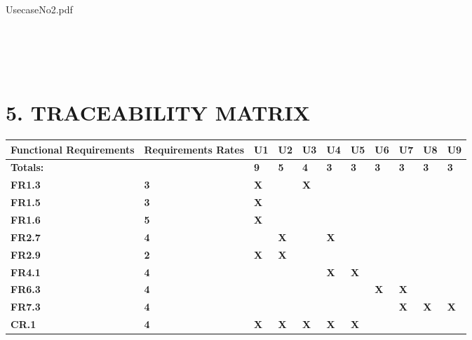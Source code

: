 \documentclass[9pt]{report}
\begin{document}
{UsecaseNo2.pdf}


\section*{\\\\5. TRACEABILITY MATRIX}

\begin{tabular}{|p{2cm}|p{2cm}|p{1cm}|p{1cm}|p{1cm}|p{1cm}|p{1cm}|p{1cm}|p{1cm}|p{1cm}|p{1cm}|}
     \hline
 \rowcolor{lightgray} \textbf{Functional Requirements} & \textbf{Requirements Rates} & \textbf{U1} & \textbf{U2} & \textbf{U3} & \textbf{U4} & \textbf{U5} & \textbf{U6} & \textbf{U7} & \textbf{U8} & \textbf{U9}\\
 \hline
 \textbf{Totals:} & \textbf{} & \textbf{9} & \textbf{5} & \textbf{4} & \textbf{3} & \textbf{3} & \textbf{3} & \textbf{3} & \textbf{3} & \textbf{3}\\
 \hline
 \textbf{FR1.3} & \textbf{3} & \textbf{X} & \textbf{} & \textbf{X} & \textbf{} & \textbf{} & \textbf{} & \textbf{} & \textbf{} & \textbf{}\\
 \hline
 \textbf{FR1.5} & \textbf{3} & \textbf{X} & \textbf{} & \textbf{} & \textbf{} & \textbf{} & \textbf{} & \textbf{} & \textbf{} & \textbf{}\\
 \hline
 \textbf{FR1.6} & \textbf{5} & \textbf{X} & \textbf{} & \textbf{} & \textbf{} & \textbf{} & \textbf{} & \textbf{} & \textbf{} & \textbf{}\\
 \hline
 \textbf{FR2.7} & \textbf{4} & \textbf{} & \textbf{X} & \textbf{} & \textbf{X} & \textbf{} & \textbf{} & \textbf{} & \textbf{} & \textbf{}\\
 \hline
 \textbf{FR2.9} & \textbf{2} & \textbf{X} & \textbf{X} & \textbf{} & \textbf{} & \textbf{} & \textbf{} & \textbf{} & \textbf{} & \textbf{}\\
 \hline
 \textbf{FR4.1} & \textbf{4} & \textbf{} & \textbf{} & \textbf{} & \textbf{X} & \textbf{X} & \textbf{} & \textbf{} & \textbf{} & \textbf{}\\
 \hline
 \textbf{FR6.3} & \textbf{4} & \textbf{} & \textbf{} & \textbf{} & \textbf{} & \textbf{} & \textbf{X} & \textbf{X} & \textbf{} & \textbf{}\\
 \hline
 \textbf{FR7.3} & \textbf{4} & \textbf{} & \textbf{} & \textbf{} & \textbf{} & \textbf{} & \textbf{} & \textbf{X} & \textbf{X} & \textbf{X}\\
 \hline
 \hline
 \textbf{CR.1} & \textbf{4} & \textbf{X} & \textbf{X} & \textbf{X} & \textbf{X} & \textbf{X} & \textbf{} & \textbf{} & \textbf{} & \textbf{}\\

\end{tabular}
\end{document}
